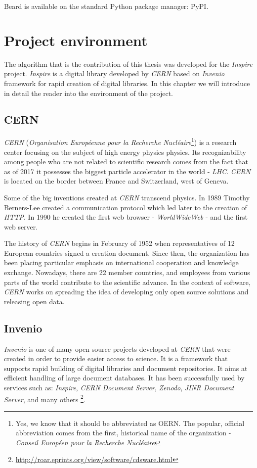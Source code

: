 \documentclass{pracamgr}
\begin{document}
Beard is available on the standard Python package manager: PyPI.


\chapter{Project environment}

The algorithm that is the contribution of this thesis was developed for the
\textit{Inspire} project. \textit{Inspire} is a digital library developed by \textit{CERN}
based on \textit{Invenio} framework for rapid creation of digital libraries. In this chapter
we will introduce in detail the reader into the environment of the project.

\section{CERN}
\textit{CERN} (\textit{Organisation Europ\'eenne pour la Recherche
Nucl\'eaire}\footnote{Yes, we know that it should be abbreviated as OERN. The popular,
official abbreviation comes from the first, historical name of the
organization - \textit{Conseil Europ\'een pour la Recherche Nucl\'eaire} }) is a research
center focusing on the subject of high energy physics physics. Its recognizability among
people who are not related to scientific research comes from the fact that as of 2017 it
possesses the biggest particle accelerator in the world - \textit{LHC}. \textit{CERN} is
located on the border between France and Switzerland, west of Geneva.

Some of the big inventions created at \textit{CERN} transcend physics. In 1989 Timothy
Berners-Lee created a communication protocol which led later to the creation of
\textit{HTTP}. In 1990 he created the first web browser - \textit{WorldWideWeb} - and the
first web server.

The history of \textit{CERN} begins in February of 1952 when representatives of 12 European
countries signed a creation document. Since then, the organization has been placing particular 
emphasis on international cooperation and knowledge exchange. Nowadays, there are 22 member 
countries, and employees \citep{cps} from various parts of the world contribute to the
scientific advance. In the context of software, \textit{CERN} works on spreading the idea of 
developing only open source solutions and releasing open data.

\section{Invenio}
\textit{Invenio} is one of many open source projects developed at \textit{CERN} that were
created in order to provide easier access to science. It is a framework that supports rapid
building of digital libraries and document repositories. It aims at efficient handling of
large document databases. It has been successfully used by services such as: \textit{Inspire},
\textit{CERN Document Server}, \textit{Zenodo}, \textit{JINR Document Server}, and many others 
\footnote{\href{http://roar.eprints.org/view/software/cdsware.html}
{http://roar.eprints.org/view/software/cdsware.html}}.
\end{document}
